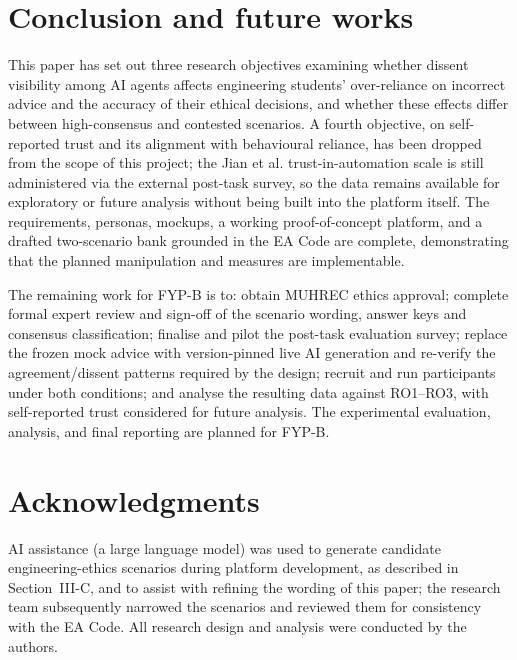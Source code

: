 \documentclass[conference]{IEEEtran}
\begin{document}
\section{Conclusion and future works}

This paper has set out three research objectives examining whether dissent visibility among AI agents affects engineering students' over-reliance on incorrect advice and the accuracy of their ethical decisions, and whether these effects differ between high-consensus and contested scenarios. A fourth objective, on self-reported trust and its alignment with behavioural reliance, has been dropped from the scope of this project; the Jian et al. trust-in-automation scale is still administered via the external post-task survey, so the data remains available for exploratory or future analysis without being built into the platform itself. The requirements, personas, mockups, a working proof-of-concept platform, and a drafted two-scenario bank grounded in the EA Code are complete, demonstrating that the planned manipulation and measures are implementable.

The remaining work for FYP-B is to: obtain MUHREC ethics approval; complete formal expert review and sign-off of the scenario wording, answer keys and consensus classification; finalise and pilot the post-task evaluation survey; replace the frozen mock advice with version-pinned live AI generation and re-verify the agreement/dissent patterns required by the design; recruit and run participants under both conditions; and analyse the resulting data against RO1--RO3, with self-reported trust considered for future analysis. The experimental evaluation, analysis, and final reporting are planned for FYP-B.

\section{Acknowledgments}

AI assistance (a large language model) was used to generate candidate engineering-ethics scenarios during platform development, as described in Section~III-C, and to assist with refining the wording of this paper; the research team subsequently narrowed the scenarios and reviewed them for consistency with the EA Code. All research design and analysis were conducted by the authors.


 
\end{document}
